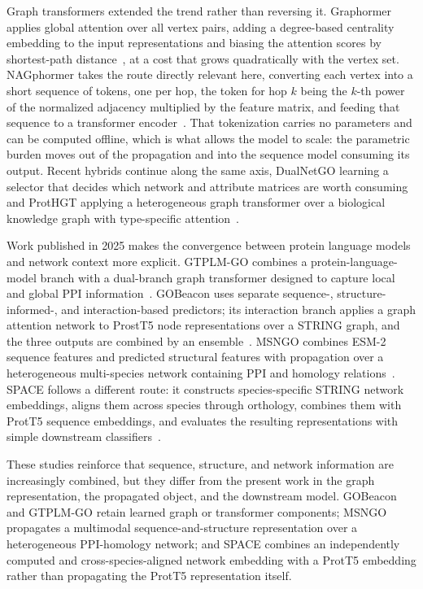 \documentclass[Ingles]{ic-tese-v3}
\begin{document}
Graph transformers extended the trend rather than reversing it. Graphormer applies global attention
over all vertex pairs, adding a degree-based centrality embedding to the input representations and
biasing the attention scores by shortest-path distance~\cite{ying2021graphormer}, at a cost that
grows quadratically with the vertex set. NAGphormer takes the route directly relevant here,
converting each vertex into a short sequence of tokens, one per hop, the token for hop $k$ being the
$k$-th power of the normalized adjacency multiplied by the feature matrix, and feeding that sequence
to a transformer encoder~\cite{chen2023nagphormer}. That tokenization carries no parameters and can
be computed offline, which is what allows the model to scale: the parametric burden moves out of the
propagation and into the sequence model consuming its output. Recent hybrids continue along the same
axis, DualNetGO learning a selector that decides which network and attribute matrices are worth
consuming~\cite{chen2024dualnetgo} and ProtHGT applying a heterogeneous graph transformer over a
biological knowledge graph with type-specific attention~\cite{ulusoy2025prothgt}.

Work published in 2025 makes the convergence between protein language models and network context more explicit. GTPLM-GO combines a protein-language-model branch with a dual-branch graph transformer designed to capture local and global PPI information~\cite{zhang2025gtplmgo}. GOBeacon uses separate sequence-, structure-informed-, and interaction-based predictors; its interaction branch applies a graph attention network to ProstT5 node representations over a STRING graph, and the three outputs are combined by an ensemble~\cite{lin2025gobeacon}. MSNGO combines ESM-2 sequence features and predicted structural features with propagation over a heterogeneous multi-species network containing PPI and homology relations~\cite{wang2025msngo}. SPACE follows a different route: it constructs species-specific STRING network embeddings, aligns them across species through orthology, combines them with ProtT5 sequence embeddings, and evaluates the resulting representations with simple downstream classifiers~\cite{hu2025space}.

These studies reinforce that sequence, structure, and network information are increasingly combined, but they differ from the present work in the graph representation, the propagated object, and the downstream model. GOBeacon and GTPLM-GO retain learned graph or transformer components; MSNGO propagates a multimodal sequence-and-structure representation over a heterogeneous PPI-homology network; and SPACE combines an independently computed and cross-species-aligned network embedding with a ProtT5 embedding rather than propagating the ProtT5 representation itself.
\end{document}
